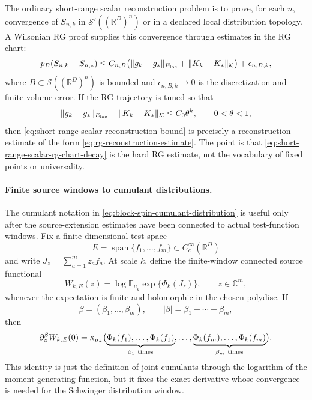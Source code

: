 \begin{construction}
The ordinary short-range scalar reconstruction problem is to prove, for
each \(n\), convergence of \(S_{n,k}\) in \(\mathcal S'((\mathbb R^D)^n)\)
or in a declared local distribution topology.  A Wilsonian RG proof supplies
this convergence through estimates in the RG chart:
\begin{equation}
  p_B\!\left(S_{n,k}-S_{n,\ast}\right)
  \leq
  C_{n,B}
  \bigl(
    \|g_k-g_\ast\|_{E_{\rm loc}}
    +\|K_k-K_\ast\|_{\mathcal K}
  \bigr)
  +\epsilon_{n,B,k},
  \label{eq:short-range-scalar-reconstruction-bound}
\end{equation}
where \(B\subset\mathcal S((\mathbb R^D)^n)\) is bounded and
\(\epsilon_{n,B,k}\to0\) is the discretization and finite-volume error.
If the RG trajectory is tuned so that
\begin{equation}
  \|g_k-g_\ast\|_{E_{\rm loc}}+\|K_k-K_\ast\|_{\mathcal K}
  \leq C_0\theta^k,\qquad 0<\theta<1 ,
  \label{eq:short-range-scalar-rg-chart-decay}
\end{equation}
then \eqref{eq:short-range-scalar-reconstruction-bound} is precisely a
reconstruction estimate of the form
\eqref{eq:rg-reconstruction-estimate}.  The point is that
\eqref{eq:short-range-scalar-rg-chart-decay} is the hard RG estimate, not
the vocabulary of fixed points or universality.
\end{construction}

\paragraph{Finite source windows to cumulant distributions.}
The cumulant notation in
\eqref{eq:block-spin-cumulant-distribution} is useful only after the
source-extension estimates have been connected to actual test-function
windows.  Fix a finite-dimensional test space
\[
  E=\operatorname{span}\{f_1,\ldots,f_m\}
  \subset C_c^\infty(\mathbb R^D)
\]
and write \(J_z=\sum_{a=1}^m z_a f_a\).  At scale \(k\), define the
finite-window connected source functional
\begin{equation}
  W_{k,E}(z)
  =
  \log
  \mathbb E_{\mu_k}\exp\{\Phi_k(J_z)\},
  \qquad z\in\mathbb C^m,
  \label{eq:short-range-source-window-functional}
\end{equation}
whenever the expectation is finite and holomorphic in the chosen polydisc.
If
\[
  \beta=(\beta_1,\ldots,\beta_m),
  \qquad
  |\beta|=\beta_1+\cdots+\beta_m,
\]
then
\begin{equation}
  \partial_z^\beta W_{k,E}(0)
  =
  \kappa_{\mu_k}\bigl(
    \underbrace{\Phi_k(f_1),\ldots,\Phi_k(f_1)}_{\beta_1\ {\rm times}},
    \ldots,
    \underbrace{\Phi_k(f_m),\ldots,\Phi_k(f_m)}_{\beta_m\ {\rm times}}
  \bigr).
  \label{eq:short-range-source-window-cumulant-derivative}
\end{equation}
This identity is just the definition of joint cumulants through the
logarithm of the moment-generating function, but it fixes the exact
derivative whose convergence is needed for the Schwinger distribution
window.

